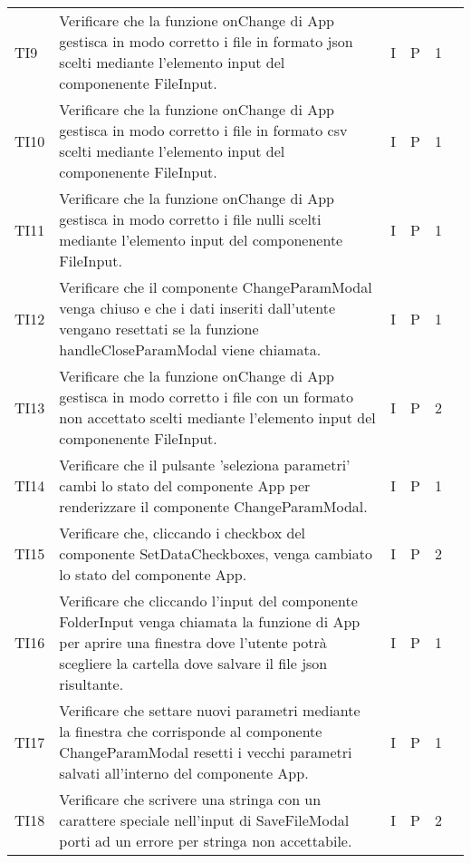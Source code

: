 \begin{longtable} {
		>{}p{12mm}
		>{}p{79.5mm}
		>{}p{9mm}
		>{}p{8mm}
		>{}p{14mm}
		>{}p{0mm}}
    TI9      &  Verificare che la funzione onChange di App gestisca in modo corretto i file in formato json scelti mediante l'elemento input del componenente FileInput. & I & P  & 1 & \TBstrut \\ [2mm]
    TI10     &  Verificare che la funzione onChange di App gestisca in modo corretto i file in formato csv scelti mediante l'elemento input del componenente FileInput. & I & P  & 1 & \TBstrut \\ [2mm]
    TI11     &  Verificare che la funzione onChange di App gestisca in modo corretto i file nulli scelti mediante l'elemento input del componenente FileInput. & I & P  & 1 & \TBstrut \\ [2mm]
    TI12     &  Verificare che il componente ChangeParamModal venga chiuso e che i dati inseriti dall'utente vengano resettati se la funzione handleCloseParamModal viene chiamata. & I & P  & 1 & \TBstrut \\ [2mm]
    TI13     &  Verificare che la funzione onChange di App gestisca in modo corretto i file con un formato non accettato scelti mediante l'elemento input del componenente FileInput. & I & P  & 2 & \TBstrut \\ [2mm]
    TI14     &  Verificare che il pulsante 'seleziona parametri' cambi lo stato del componente App per renderizzare il componente ChangeParamModal. & I & P  & 1 & \TBstrut \\ [2mm]
    TI15     &  Verificare che, cliccando i checkbox del componente SetDataCheckboxes, venga cambiato lo stato del componente App. & I & P  & 2 & \TBstrut \\ [2mm]
    TI16     &  Verificare che cliccando l'input del componente FolderInput venga chiamata la funzione di App per aprire una finestra dove l'utente potrà scegliere la cartella dove salvare il file json risultante. & I & P  & 1 & \TBstrut \\ [2mm]
    TI17     &  Verificare che settare nuovi parametri mediante la finestra che corrisponde al componente ChangeParamModal resetti i vecchi parametri salvati all'interno del componente App. & I & P  & 1 & \TBstrut \\ [2mm]
    TI18     &  Verificare che scrivere una stringa con un carattere speciale nell'input di SaveFileModal porti ad un errore per stringa non accettabile. & I & P  & 2 & \TBstrut \\ [2mm]


\end{longtable}
